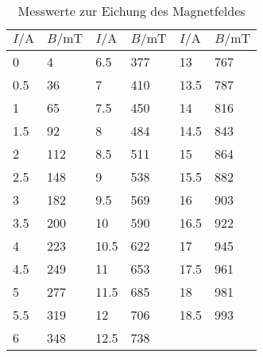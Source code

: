 
\begin{table}[H]
  \centering
  \caption{Messwerte zur Eichung des Magnetfeldes}
  \label{tab:tabe1}
    \begin{tabular}{l l| l l | l l}
    \toprule
    $ I / \si{\ampere} $ & $ B / \si{\milli\tesla} $ & $ I / \si{\ampere} $ & $ B / \si{\milli\tesla} $ & $ I / \si{\ampere} $ & $ B / \si{\milli\tesla} $ \\
    \midrule
    0 & 4 & 6.5 & 377 & 13 & 767 \\
    0.5 & 36 & 7 & 410 & 13.5 & 787 \\
    1 & 65 & 7.5 & 450 & 14 & 816 \\
    1.5 & 92 & 8 & 484 & 14.5 & 843 \\
    2 & 112 & 8.5 & 511 & 15 & 864 \\
    2.5 & 148 & 9 & 538 & 15.5 & 882 \\
    3 & 182 & 9.5 & 569 & 16 & 903 \\
    3.5 & 200 & 10 & 590 & 16.5 & 922 \\
    4 & 223 & 10.5 & 622 & 17 & 945 \\
    4.5 & 249 & 11 & 653 & 17.5 & 961 \\
    5 & 277 & 11.5 & 685 & 18  & 981 \\
    5.5 & 319 & 12 & 706 & 18.5 & 993 \\
    6 & 348 & 12.5 & 738 & & \\



          \bottomrule
        \end{tabular}
    \end{table}

